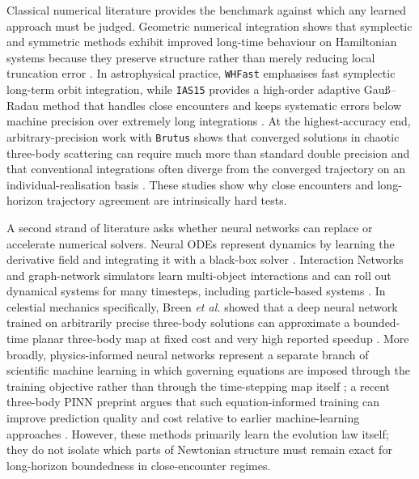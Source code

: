 \documentclass[12pt]{article}
\begin{document}
Classical numerical literature provides the benchmark against which any learned approach must be judged. Geometric numerical integration shows that symplectic and symmetric methods exhibit improved long-time behaviour on Hamiltonian systems because they preserve structure rather than merely reducing local truncation error \cite{hairer2006geometric}. In astrophysical practice, \texttt{WHFast} emphasises fast symplectic long-term orbit integration, while \texttt{IAS15} provides a high-order adaptive Gau\ss--Radau method that handles close encounters and keeps systematic errors below machine precision over extremely long integrations \cite{Rein_2015,Rein_2014}. At the highest-accuracy end, arbitrary-precision work with \texttt{Brutus} shows that converged solutions in chaotic three-body scattering can require much more than standard double precision and that conventional integrations often diverge from the converged trajectory on an individual-realisation basis \cite{boekholt2015reliability}. These studies show why close encounters and long-horizon trajectory agreement are intrinsically hard tests.

A second strand of literature asks whether neural networks can replace or accelerate numerical solvers. Neural ODEs represent dynamics by learning the derivative field and integrating it with a black-box solver \cite{chen2018neuralode}. Interaction Networks and graph-network simulators learn multi-object interactions and can roll out dynamical systems for many timesteps, including particle-based systems \cite{battaglia2016interaction,sanchez2020learning}. In celestial mechanics specifically, Breen \emph{et al.} showed that a deep neural network trained on arbitrarily precise three-body solutions can approximate a bounded-time planar three-body map at fixed cost and very high reported speedup \cite{breen2020newton}. More broadly, physics-informed neural networks represent a separate branch of scientific machine learning in which governing equations are imposed through the training objective rather than through the time-stepping map itself \cite{cuomo2022scientific}; a recent three-body PINN preprint argues that such equation-informed training can improve prediction quality and cost relative to earlier machine-learning approaches \cite{pereira2025advancing}. However, these methods primarily learn the evolution law itself; they do not isolate which parts of Newtonian structure must remain exact for long-horizon boundedness in close-encounter regimes.
\end{document}
